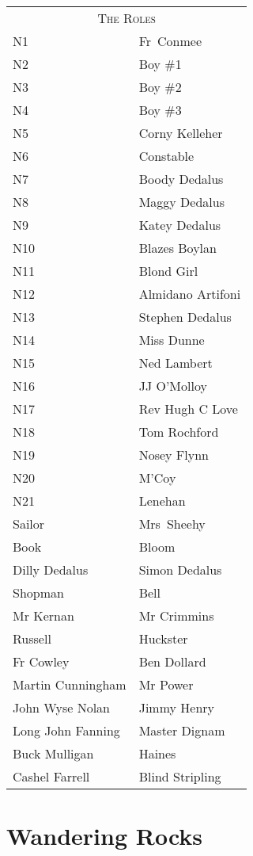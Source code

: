 \begin{tabular}{lp{10cm}}
    \multicolumn{2}{c}{\Large \textsc{The Roles}} \\
N1              & Fr~Conmee \\
N2              & Boy \#1 \\
N3              & Boy \#2 \\
N4              & Boy \#3 \\
N5              & Corny Kelleher \\
N6              & Constable \\
N7              & Boody Dedalus \\
N8              & Maggy Dedalus \\
N9              & Katey Dedalus \\
N10             & Blazes Boylan \\
N11             & Blond Girl \\
N12             & Almidano Artifoni \\
N13             & Stephen Dedalus \\
N14             & Miss Dunne \\
N15             & Ned Lambert \\
N16             & JJ O'Molloy \\
N17             & Rev Hugh C Love \\
N18             & Tom Rochford \\
N19             & Nosey Flynn \\
N20             & M'Coy \\
N21             & Lenehan \\
Sailor          & Mrs~Sheehy \\
Book            & Bloom \\
Dilly Dedalus   & Simon Dedalus \\
Shopman         & Bell \\
Mr Kernan       & Mr Crimmins \\
Russell         & Huckster \\
Fr Cowley       & Ben Dollard \\
Martin Cunningham & Mr Power \\
John Wyse Nolan & Jimmy Henry \\
Long John Fanning & Master Dignam \\
Buck Mulligan   & Haines \\
Cashel Farrell  & Blind Stripling \\
\end{tabular}

\thispagestyle{empty}
\newpage


\setcounter{page}{1}

\section*{Wandering Rocks}




